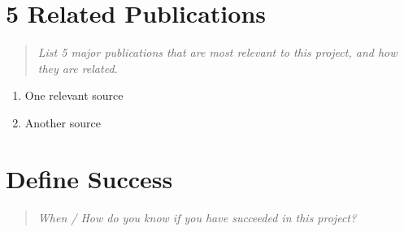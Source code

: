 \documentclass{proc}
\begin{document}
\section{5 Related Publications}
\begin{quote}
\textit{List 5 major publications that are most relevant to this project, and how they are related.}
\end{quote}

\begin{enumerate} 
\item One relevant source
\item Another source
\end{enumerate}

\section{Define Success}
\begin{quote}
\textit{When / How do you know if you have succeeded in this project?}
\end{quote}



\end{document}
